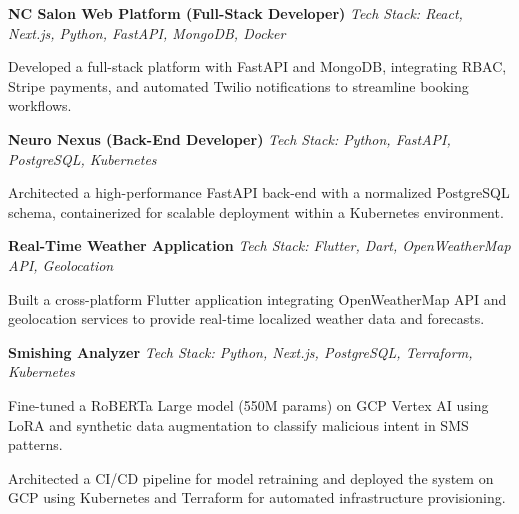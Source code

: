 \textbf{NC Salon Web Platform (Full-Stack Developer)} \hfill \textit{Tech Stack: React, Next.js, Python, FastAPI, MongoDB, Docker}
\begin{highlights}
    \item Developed a full-stack platform with FastAPI and MongoDB, integrating RBAC, Stripe payments, and automated Twilio notifications to streamline booking workflows.
\end{highlights}

\textbf{Neuro Nexus (Back-End Developer)} \hfill \textit{Tech Stack: Python, FastAPI, PostgreSQL, Kubernetes}
\begin{highlights}
    \item Architected a high-performance FastAPI back-end with a normalized PostgreSQL schema, containerized for scalable deployment within a Kubernetes environment.
\end{highlights}

\textbf{Real-Time Weather Application} \hfill \textit{Tech Stack: Flutter, Dart, OpenWeatherMap API, Geolocation}
\begin{highlights}
    \item Built a cross-platform Flutter application integrating OpenWeatherMap API and geolocation services to provide real-time localized weather data and forecasts.
\end{highlights}

\textbf{Smishing Analyzer} \hfill \textit{Tech Stack: Python, Next.js, PostgreSQL, Terraform, Kubernetes}
\begin{highlights}
\item Fine-tuned a RoBERTa Large model (550M params) on GCP Vertex AI using LoRA and synthetic data augmentation to classify malicious intent in SMS patterns.
\item Architected a CI/CD pipeline for model retraining and deployed the system on GCP using Kubernetes and Terraform for automated infrastructure provisioning.
\end{highlights}
